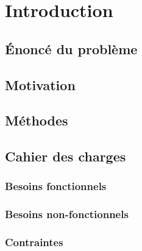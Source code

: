 \pagestyle{plain}
\chapter{Introduction}





\section{Énoncé du problème}

\section{Motivation}

\section{Méthodes}

\section{Cahier des charges}

\subsection{Besoins fonctionnels}

\subsection{Besoins non-fonctionnels}

\subsection{Contraintes}

\clearpage
